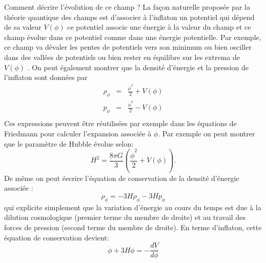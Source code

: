 Comment décrire l'évolution de ce champ ? La façon naturelle proposée par la théorie quantique des champs est d'associer à l'inflaton un potentiel qui dépend de sa valeur $V(\phi)$  ce potentiel associe une énergie à la valeur du champ et ce champ évolue dans ce potentiel comme dans une énergie potentielle. Par exemple, ce champ va dévaler les pentes de potentiels vers son minimum ou bien osciller dans des vallées de potentiels ou bien rester en équilibre sur les extrema de $V(\phi)$ . On peut également montrer que la densité d'énergie et la pression de l'inflaton sont données par  
\begin{eqnarray}
\rho_\phi&=&\frac{\dot \phi^2}{2}+V(\phi)\\
p_\phi&=&\frac{\dot \phi^2}{2}-V(\phi)\\
\end{eqnarray}
Ces expressions peuvent être réutilisées par exemple dans les équations de Friedmann pour calculer l'expansion associée à $\phi$. Par exemple on peut montrer que le paramètre de Hubble évolue selon:
\begin{equation}
H^2=\frac{8\pi G}{3}\left(\frac{\dot \phi^2}{2}+V(\phi)\right).
\label{e:hubbleinf}
\end{equation}
De même on peut éecrire l'équation de conservation de la densité d'énergie associée :
\begin{equation}
\dot \rho_\phi= -3H\rho_\phi-3Hp_\phi
\end{equation}
qui explicite simplement que la variation d'énergie au cours du temps est due à la dilution cosmologique (premier terme du membre de droite) et au travail des forces de pression (second terme du membre de droite). En terme d'inflaton, cette équation de conservation devient:
\begin{equation}
\ddot \phi+ 3H \dot \phi = -\frac{d V}{d\phi}
\end{equation}


